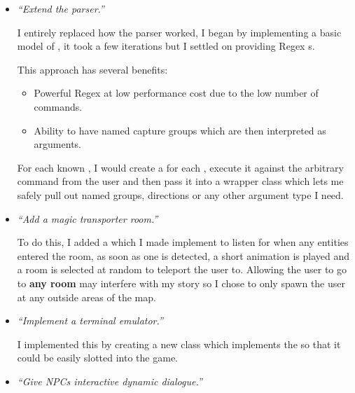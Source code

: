 \documentclass{article}
\begin{document}
\begin{multicols}{2}
\begin{itemize}[leftmargin=*]

                \item \textit{``Extend the parser.''}
                
                    I entirely replaced how the parser worked, I began by implementing a basic model of , it took a few iterations but I settled on providing Regex s.

                    This approach has several benefits:

                    \begin{itemize}[leftmargin=*]
                        \item Powerful Regex at low performance cost due to the low number of commands.
                        \item Ability to have named capture groups which are then interpreted as arguments.
                    \end{itemize}

                    For each known , I would create a  for each , execute it against the arbitrary command from the user and then pass it into a wrapper class  which lets me safely pull out named groups, directions or any other argument type I need.
                
                \item \textit{``Add a magic transporter room.''}
                
                    To do this, I added a  which I made implement  to listen for when any entities entered the room, as soon as one is detected, a short animation is played and a room is selected at random to teleport the user to. Allowing the user to go to \textbf{any room} may interfere with my story so I chose to only spawn the user at any outside areas of the map.
                
                \item \textit{``Implement a terminal emulator.''}
            
                    I implemented this by creating a new class  which implements the  so that it could be easily slotted into the game. 
                
                \item \textit{``Give NPCs interactive dynamic dialogue.''}
                

\end{itemize}
\end{multicols}
\end{document}
